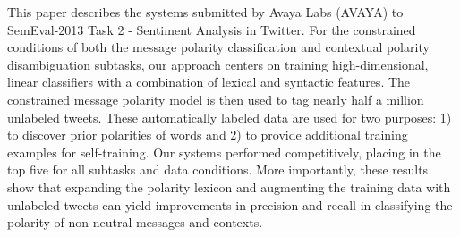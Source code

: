 This paper describes the systems submitted by Avaya Labs (AVAYA) to SemEval-2013 Task 2 - Sentiment Analysis in Twitter.  For the constrained
 conditions of both the message polarity classification and contextual polarity
 disambiguation subtasks, our approach centers on training high-dimensional,
 linear classifiers with a combination of lexical and syntactic features.  The
 constrained message polarity model is then used to tag nearly half a million
 unlabeled tweets.  These automatically labeled data are used for two purposes:
 1) to discover prior polarities of words and 2) to provide additional training
 examples for self-training.  Our systems performed competitively, placing in
 the top five for all subtasks and data conditions.  More importantly, these
 results show that expanding the polarity lexicon and augmenting the training
 data with unlabeled tweets can yield improvements in precision and recall in
 classifying the polarity of non-neutral messages and contexts.

